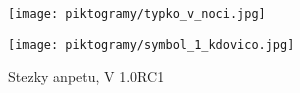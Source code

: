 \documentclass[a6paper]{article}
\begin{document}
\vspace{\fill}
\begin{center}
	\texttt{[image: piktogramy/typko\_v\_noci.jpg]}
\end{center}
\clearpage

\vspace*{50pt}
\begin{center}
	\texttt{[image: piktogramy/symbol\_1\_kdovico.jpg]}
\end{center}

\vspace{\fill}

\begin{tiny}
	\hspace{\fill}
	Stezky anpetu, V 1.0RC1
\end{tiny}
\end{document}
